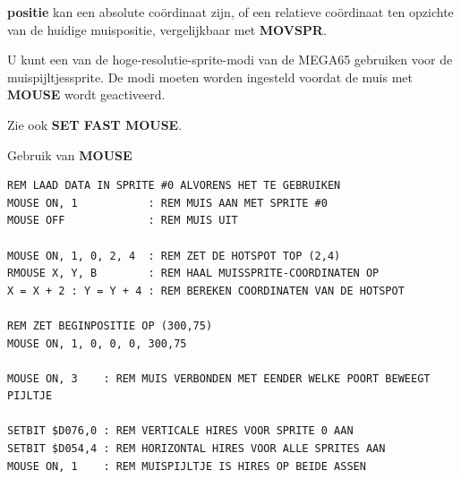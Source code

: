 \begin{description}[leftmargin=2cm,style=nextline]
                  {\bf positie} kan een absolute coördinaat zijn, of een relatieve coördinaat ten opzichte van de huidige muispositie, vergelijkbaar met {\bf MOVSPR}.

                  U kunt een van de hoge-resolutie-sprite-modi van de MEGA65 gebruiken voor de muispijltjessprite. De modi moeten worden ingesteld voordat de muis met {\bf MOUSE} wordt geactiveerd.

                  Zie ook {\bf SET FAST MOUSE}.

\item [Voorbeelden:] Gebruik van {\bf MOUSE}

\begin{tcolorbox}[colback=black,coltext=white]
\verbatimfont{\codefont}
\begin{verbatim}
REM LAAD DATA IN SPRITE #0 ALVORENS HET TE GEBRUIKEN
MOUSE ON, 1           : REM MUIS AAN MET SPRITE #0
MOUSE OFF             : REM MUIS UIT

MOUSE ON, 1, 0, 2, 4  : REM ZET DE HOTSPOT TOP (2,4)
RMOUSE X, Y, B        : REM HAAL MUISSPRITE-COORDINATEN OP
X = X + 2 : Y = Y + 4 : REM BEREKEN COORDINATEN VAN DE HOTSPOT

REM ZET BEGINPOSITIE OP (300,75)
MOUSE ON, 1, 0, 0, 0, 300,75

MOUSE ON, 3    : REM MUIS VERBONDEN MET EENDER WELKE POORT BEWEEGT PIJLTJE

SETBIT $D076,0 : REM VERTICALE HIRES VOOR SPRITE 0 AAN
SETBIT $D054,4 : REM HORIZONTAL HIRES VOOR ALLE SPRITES AAN
MOUSE ON, 1    : REM MUISPIJLTJE IS HIRES OP BEIDE ASSEN
\end{verbatim}
\end{tcolorbox}
\end{description}


\newpage
